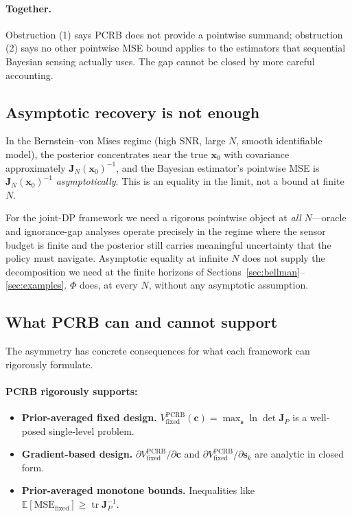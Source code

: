 \documentclass[11pt,a4paper]{article}
\newcommand{\E}{\mathbb{E}}
\newcommand{\tr}{\operatorname{tr}}
\begin{document}
\begin{enumerate}[leftmargin=2em, nosep]
\end{enumerate}

\paragraph{Together.}  Obstruction (1) says PCRB does not provide a pointwise summand; obstruction (2) says no other pointwise MSE bound applies to the estimators that sequential Bayesian sensing actually uses.  The gap cannot be closed by more careful accounting.

\subsection{Asymptotic recovery is not enough}
\label{subsec:asymptotic}

In the Bernstein--von Mises regime (high SNR, large $N$, smooth identifiable model), the posterior concentrates near the true $\bm{x}_0$ with covariance approximately $\bm{J}_N(\bm{x}_0)^{-1}$, and the Bayesian estimator's pointwise MSE is $\bm{J}_N(\bm{x}_0)^{-1}$ \emph{asymptotically}.  This is an equality in the limit, not a bound at finite $N$.

For the joint-DP framework we need a rigorous pointwise object at \emph{all} $N$---oracle and ignorance-gap analyses operate precisely in the regime where the sensor budget is finite and the posterior still carries meaningful uncertainty that the policy must navigate.  Asymptotic equality at infinite $N$ does not supply the decomposition we need at the finite horizons of Sections~\ref{sec:bellman}--\ref{sec:examples}.  $\Phi$ does, at every $N$, without any asymptotic assumption.

\subsection{What PCRB can and cannot support}
\label{subsec:pcrb_capabilities}

The asymmetry has concrete consequences for what each framework can rigorously formulate.

\paragraph{PCRB rigorously supports:}
\begin{itemize}[nosep, leftmargin=2em]
  \item \textbf{Prior-averaged fixed design.}  $V^{\mathrm{PCRB}}_{\mathrm{fixed}}(\bm{c}) = \max_{\bm{s}} \ln\det \bm{J}_P$ is a well-posed single-level problem.
  \item \textbf{Gradient-based design.}  $\partial V^{\mathrm{PCRB}}_{\mathrm{fixed}} / \partial\bm{c}$ and $\partial V^{\mathrm{PCRB}}_{\mathrm{fixed}} / \partial\bm{s}_k$ are analytic in closed form.
  \item \textbf{Prior-averaged monotone bounds.}  Inequalities like $\E[\mathrm{MSE}_{\mathrm{fixed}}] \ge \tr\bm{J}_P^{-1}$.
\end{itemize}
\end{document}
